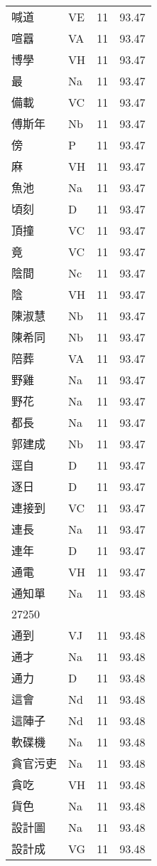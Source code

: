 \documentclass[twocolumn]{book}
\begin{document}
\begin{supertabular}{llrr}
喊道 & VE & 11 &  93.47\\
喧囂 & VA & 11 &  93.47\\
博學 & VH & 11 &  93.47\\
最 & Na & 11 &  93.47\\
備載 & VC & 11 &  93.47\\
傅斯年 & Nb & 11 &  93.47\\
傍 & P & 11 &  93.47\\
麻 & VH & 11 &  93.47\\
魚池 & Na & 11 &  93.47\\
頃刻 & D & 11 &  93.47\\
頂撞 & VC & 11 &  93.47\\
竟 & VC & 11 &  93.47\\
陰間 & Nc & 11 &  93.47\\
陰 & VH & 11 &  93.47\\
陳淑慧 & Nb & 11 &  93.47\\
陳希同 & Nb & 11 &  93.47\\
陪葬 & VA & 11 &  93.47\\
野雞 & Na & 11 &  93.47\\
野花 & Na & 11 &  93.47\\
都長 & Na & 11 &  93.47\\
郭建成 & Nb & 11 &  93.47\\
逕自 & D & 11 &  93.47\\
逐日 & D & 11 &  93.47\\
連接到 & VC & 11 &  93.47\\
連長 & Na & 11 &  93.47\\
連年 & D & 11 &  93.47\\
通電 & VH & 11 &  93.47\\
通知單 & Na & 11 &  93.48\\
27250\\
通到 & VJ & 11 &  93.48\\
通才 & Na & 11 &  93.48\\
通力 & D & 11 &  93.48\\
這會 & Nd & 11 &  93.48\\
這陣子 & Nd & 11 &  93.48\\
軟碟機 & Na & 11 &  93.48\\
貪官污吏 & Na & 11 &  93.48\\
貪吃 & VH & 11 &  93.48\\
貨色 & Na & 11 &  93.48\\
設計圖 & Na & 11 &  93.48\\
設計成 & VG & 11 &  93.48\\

\end{supertabular}
\end{document}
